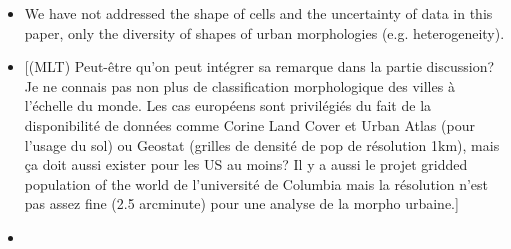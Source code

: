 \documentclass[11pt,a4paper,sans]{moderncv}        %
\begin{document}
\begin{itemize}
	\item We have not addressed the shape of cells and the uncertainty of data in this paper, only the diversity of shapes of urban morphologies (e.g. heterogeneity). 
	
	\item {}[(MLT) Peut-être qu'on peut intégrer sa remarque dans la partie discussion? Je ne connais pas non plus de classification morphologique des villes à l'échelle du monde. Les cas européens sont privilégiés du fait de la disponibilité de données comme Corine Land Cover et Urban Atlas (pour l'usage du sol) ou Geostat (grilles de densité de pop de résolution 1km), mais ça doit aussi exister pour les US au moins? Il y a aussi le projet gridded population of the world de l'université de Columbia mais la résolution n'est pas assez fine (2.5 arcminute) pour une analyse de la morpho urbaine.]
	
	\item {}
	

\end{itemize}
\end{document}
